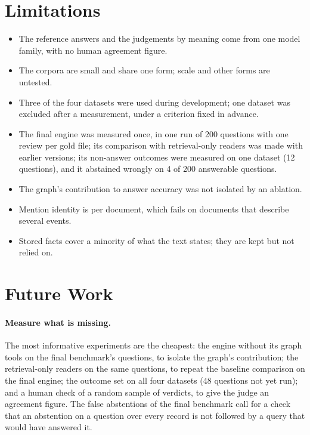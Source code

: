 \section{Limitations}\label{sec:ch09-limitations}

\begin{itemize}[nosep]
\item The reference answers and the judgements by meaning come from one model family, with no human agreement figure.
\item The corpora are small and share one form; scale and other forms are untested.
\item Three of the four datasets were used during development; one dataset was excluded after a measurement, under a
criterion fixed in advance.
\item The final engine was measured once, in one run of 200 questions with one review per gold file; its comparison
with retrieval-only readers was made with earlier versions; its non-answer outcomes were measured on one dataset (12
questions), and it abstained wrongly on 4 of 200 answerable questions.
\item The graph's contribution to answer accuracy was not isolated by an ablation.
\item Mention identity is per document, which fails on documents that describe several events.
\item Stored facts cover a minority of what the text states; they are kept but not relied on.
\end{itemize}

\section{Future Work}\label{sec:ch09-future}

\paragraph{Measure what is missing.} The most informative experiments are the cheapest: the engine without its graph
tools on the final benchmark's questions, to isolate the graph's contribution; the retrieval-only readers on the same
questions, to repeat the baseline comparison on the final engine; the outcome set on all four datasets (48 questions
not yet run); and a human check of a random sample of verdicts, to give the judge an agreement figure. The false
abstentions of the final benchmark call for a check that an abstention on a question over every record is not
followed by a query that would have answered it.

